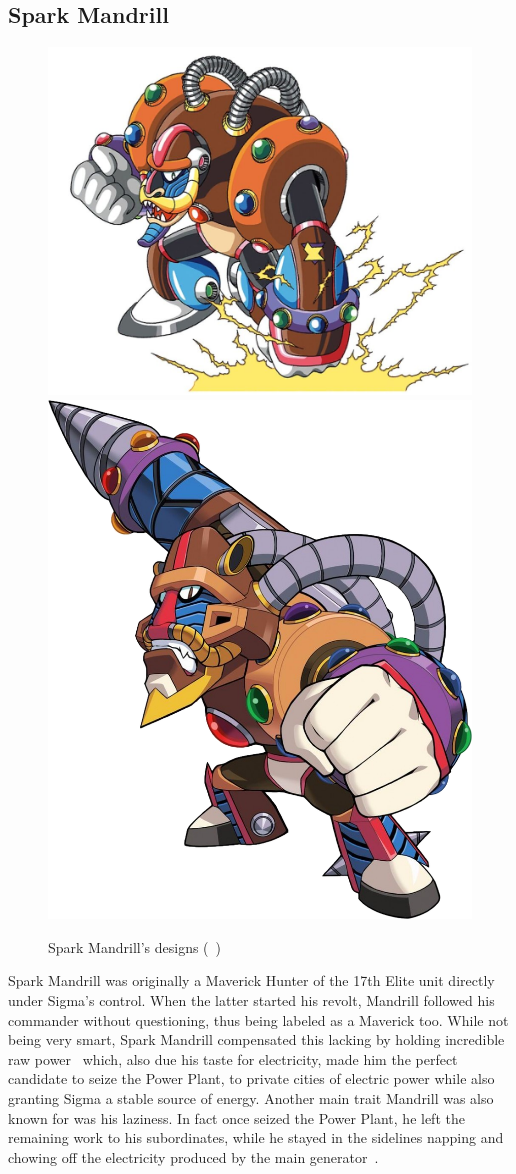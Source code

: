 \subsection{Spark Mandrill}\label{boss:Spark_mandrill}
\begin{figure}[htp]
	\centering
	\includegraphics[width=0.5\linewidth]{figures/X1/Spark_mandrill/SparkMandrill.jpg}
	\includegraphics[width=0.4\linewidth]{figures/X1/Spark_mandrill/MHXSparkMandrill.png}
	\caption{Spark Mandrill's designs (~\cite{book:MMX_Complete_art})}
\end{figure}
Spark Mandrill was originally a Maverick Hunter of the 17th Elite unit directly under Sigma's control. When the latter started his revolt, Mandrill followed his commander without questioning, thus being labeled as a Maverick too. While not being very smart, Spark Mandrill compensated this lacking by holding incredible raw power~\cite{MHX:manual} which, also due his taste for electricity, made him the perfect candidate to seize the Power Plant, to private cities of electric power while also granting Sigma a stable source of energy. Another main trait Mandrill was also known for was his laziness. In fact once seized the Power Plant, he left the remaining work to his subordinates, while he stayed in the sidelines napping and chowing off the electricity produced by the main generator~\cite{wayback:X_resources}.
